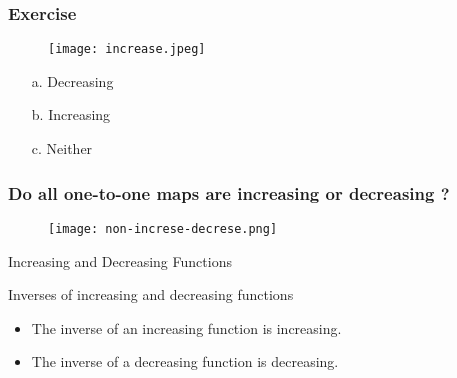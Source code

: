   \begin{frame}
    \frametitle{Exercise}
    \begin{figure}
      \centering
      \texttt{[image: increase.jpeg]}
    \end{figure}
    \pause
  \begin{enumerate}
    \item[a.] Decreasing
    \item[b.] Increasing
    \item[c.] Neither
  \end{enumerate}
  \end{frame}
  \begin{frame}
    \frametitle{Do all one-to-one maps are increasing or decreasing ? }
    \begin{figure}
      \centering
      \texttt{[image: non-increse-decrese.png]}
    \end{figure}
  \end{frame}
  \begin{frame}{Increasing and Decreasing Functions}

    \begin{alertblock}{Inverses of increasing and decreasing functions}
      \begin{itemize}
        \item The inverse of an increasing function is increasing.
        \item The inverse of a decreasing function is decreasing.
      \end{itemize}
    \end{alertblock}
  \end{frame}
  